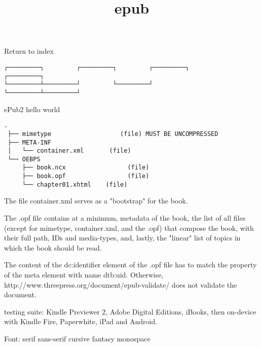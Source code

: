 \documentclass[
]{article}
\title{epub}
\author{}
\date{}
\begin{document}
\maketitle

Return to index

\begin{verbatim}
┌─────────┐         ┌─────────┐         ┌─────────┐         ┌─────────┐
└─────────┴─────────┘         └─────────┘         └─────────┴─────────┘
\end{verbatim}

ePub2 hello world

\begin{verbatim}
.
 ├── mimetype                   (file) MUST BE UNCOMPRESSED
 ├── META-INF
 │   └── container.xml       (file)
 └── OEBPS
     ├── book.ncx                 (file)
     ├── book.opf                 (file)
     └── chapter01.xhtml    (file)
\end{verbatim}

The file container.xml serves as a "bootstrap" for the book.

The .opf file contains at a minimum, metadata of the book, the list of
all files (except for mimetype, container.xml, and the .opf) that
compose the book, with their full path, IDs and media-types, and,
lastly, the "linear" list of topics in which the book should be read.

The content of the dc:identifier element of the .opf file has to match
the property of the meta element with name dtb:uid. Otherwise,
http://www.threepress.org/document/epub-validate/ does not validate the
document.

testing suite: Kindle Previewer 2, Adobe Digital Editions, iBooks, then
on-device with Kindle Fire, Paperwhite, iPad and Android.

Font: serif sans-serif cursive fantasy monospace
\end{document}
